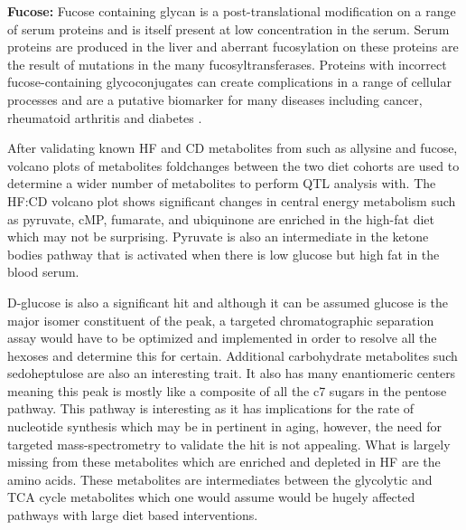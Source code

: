 \documentclass[a4paper,11pt,twoside]{book}
\begin{document}
	\textbf{Fucose:}
	Fucose containing glycan is a post-translational modification on a range of serum proteins and is itself present at low concentration in the serum. Serum proteins are produced in the liver and aberrant fucosylation on these proteins are the result of mutations in the many fucosyltransferases\citep{Becker2003Fucose}. Proteins with incorrect fucose-containing glycoconjugates can create complications in a range of cellular processes and are a putative biomarker for many diseases including cancer, rheumatoid arthritis and diabetes \citep{Wiese1997Effect}. 
	
	After validating known HF and CD metabolites from \citep{Williams2016SystemsFunction} such as allysine and fucose, volcano plots of metabolites foldchanges between the two diet cohorts are used to determine a wider number of metabolites to perform QTL analysis with. The HF:CD volcano plot shows significant changes in central energy metabolism such as pyruvate, cMP, fumarate, and ubiquinone are enriched in the high-fat diet which may not be surprising. Pyruvate is also an intermediate in the ketone bodies pathway that is activated when there is low glucose but high fat in the blood serum. 
	
	D-glucose is also a significant hit and although it can be assumed glucose is the major isomer constituent of the peak, a targeted chromatographic separation assay would have to be optimized and implemented in order to resolve all the hexoses and determine this for certain. Additional carbohydrate metabolites such sedoheptulose are also an interesting trait. It also has many enantiomeric centers meaning this peak is mostly like a composite of all the c7 sugars in the pentose pathway. This pathway is interesting as it has implications for the rate of nucleotide synthesis which may be in pertinent in aging, however, the need for targeted mass-spectrometry to validate the hit is not appealing. What is largely missing from these metabolites which are enriched and depleted in HF are the amino acids. These metabolites are intermediates between the glycolytic and TCA cycle metabolites which one would assume would be hugely affected pathways with large diet based interventions.
	
\end{document}
